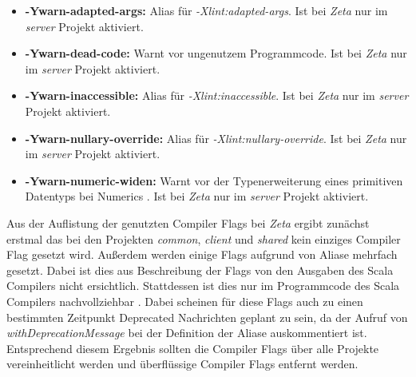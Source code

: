 \begin{itemize}
  \item \textbf{-Ywarn-adapted-args:} Alias für \textit{-Xlint:adapted-args}. Ist bei \textit{Zeta} nur im \textit{server} Projekt aktiviert.
  \item \textbf{-Ywarn-dead-code:} Warnt vor ungenutzem Programmcode. Ist bei \textit{Zeta} nur im \textit{server} Projekt aktiviert.
  \item \textbf{-Ywarn-inaccessible:} Alias für \textit{-Xlint:inaccessible}. Ist bei \textit{Zeta} nur im \textit{server} Projekt aktiviert.
  \item \textbf{-Ywarn-nullary-override:} Alias für \textit{-Xlint:nullary-override}. Ist bei \textit{Zeta} nur im \textit{server} Projekt aktiviert.
  \item \textbf{-Ywarn-numeric-widen:} Warnt vor der Typenerweiterung eines primitiven Datentyps bei Numerics \cite{scala_numeric_widen}. Ist bei \textit{Zeta} nur im \textit{server} Projekt aktiviert.
\end{itemize}

Aus der Auflistung der genutzten Compiler Flags bei \textit{Zeta} ergibt zunächst erstmal das bei den Projekten \textit{common}, \textit{client} und \textit{shared} kein einziges Compiler Flag gesetzt wird. Außerdem werden einige Flags aufgrund von Aliase mehrfach gesetzt. Dabei ist dies aus Beschreibung der Flags von den Ausgaben des Scala Compilers nicht ersichtlich. Stattdessen ist dies nur im Programmcode des Scala Compilers nachvollziehbar \cite{scala_compiler_warnings}. Dabei scheinen für diese Flags auch zu einen bestimmten Zeitpunkt Deprecated Nachrichten geplant zu sein, da der Aufruf von \textit{withDeprecationMessage} bei der Definition der Aliase auskommentiert ist. Entsprechend diesem Ergebnis sollten die Compiler Flags über alle Projekte vereinheitlicht werden und überflüssige Compiler Flags entfernt werden.

